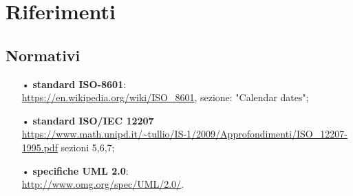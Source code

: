 \section{Riferimenti}

\subsection{Normativi}
\begin{itemize}
\item[•]\textbf{standard {ISO}-8601}:\\
\url{https://en.wikipedia.org/wiki/ISO_8601}, sezione: "Calendar dates";
\item[•]\textbf{standard ISO/{IEC} 12207}\\
\url{https://www.math.unipd.it/~tullio/IS-1/2009/Approfondimenti/ISO_12207-1995.pdf} sezioni 5,6,7;
\item[•]\textbf{specifiche {UML} 2.0}:\\
\url{http://www.omg.org/spec/UML/2.0/}.

\end{itemize} 
